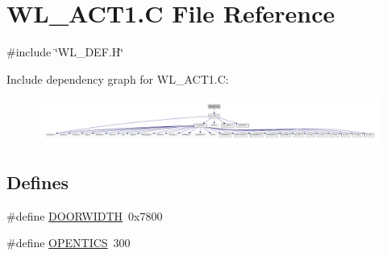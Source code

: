 \hypertarget{WL__ACT1_8C}{
\section{WL\_\-ACT1.C File Reference}
\label{WL__ACT1_8C}
}
{\ttfamily \#include \char`\"{}WL\_\-DEF.H\char`\"{}}\par
Include dependency graph for WL\_\-ACT1.C:
\nopagebreak
\begin{figure}[H]
\begin{center}
\leavevmode
\includegraphics[width=400pt]{WL__ACT1_8C__incl}
\end{center}
\end{figure}
\subsection*{Defines}
\begin{DoxyCompactItemize}
\item 
\#define \hyperlink{WL__ACT1_8C_a0be4d8ba688f6749942e278bdf5f8888}{DOORWIDTH}~0x7800
\item 
\#define \hyperlink{WL__ACT1_8C_ac93b07f61f56e62e83d34faf9f32ec28}{OPENTICS}~300
\end{DoxyCompactItemize}

